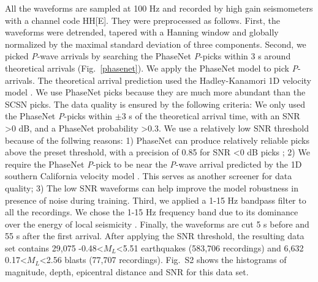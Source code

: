 \documentclass{gji}
\begin{document}
All the waveforms are sampled at 100 Hz and recorded by high gain seismometers with a channel code HH[E]. They were preprocessed as follows. First, the waveforms were detrended, tapered with a Hanning window and globally normalized by the maximal standard deviation of three components. Second, we picked \textit{P}-wave arrivals by searching the PhaseNet \textit{P}-picks \citep{phasenet} within 3 s around theoretical arrivals (Fig.~\ref{phasenet}). We apply the PhaseNet model \citep{phasenet} to pick \textit{P}-arrivals. The theoretical arrival prediction used the Hadley-Kanamori 1D velocity model \citep{kanamori,hadley}. We use PhaseNet picks because they are much more abundant than the SCSN picks. The data quality is ensured by the following criteria: We only used the PhaseNet \textit{P}-picks within $\pm{3}$ s of the theoretical arrival time, with an SNR \textgreater{0} dB, and a PhaseNet probability \textgreater{0.3}.
We use a relatively low SNR threshold because of the follwing reasons: 1) PhaseNet can produce relatively reliable picks above the preset threshold, with a precision of 0.85 for SNR \textless{0} dB picks \citep[fig.~8a in][]{phasenet}; 2) We require the PhaseNet \textit{P}-pick to be near the \textit{P}-wave arrival predicted by the 1D southern California velocity model \citep{hadley,kanamori}. This serves as another screener for data quality; 3) The low SNR waveforms can help improve the model robustness in presence of noise during training. Third, we applied a 1-15 Hz bandpass filter to all the recordings. We chose the 1-15 Hz frequency band due to its dominance over the energy of local seismicity \citep{allmann}. Finally, the waveforms are cut 5 s before and 55 s after the first arrival. After applying the SNR threshold, the resulting data set contains 29,075 -0.48\textless{$M_L$}\textless{5.51} earthquakes (583,706 recordings) and 6,632 0.17\textless{$M_L$}\textless{2.56} blasts (77,707 recordings). Fig.~S2 shows the histograms of magnitude, depth, epicentral distance and SNR for this data set.
\end{document}
